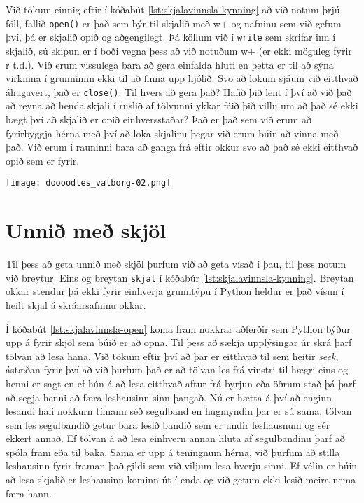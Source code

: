 Við tökum einnig eftir í kóðabút \ref{lst:skjalavinnsla-kynning} að við notum þrjú föll, fallið \texttt{open()} er það sem býr til skjalið með w+ og nafninu sem við gefum því, þá er skjalið opið og aðgengilegt.
Þá köllum við í \texttt{write} sem skrifar inn í skjalið, sú skipun er í boði vegna þess að við notuðum w+ (er ekki möguleg fyrir r t.d.).
Við erum vissulega bara að gera einfalda hluti en þetta er til að sýna virknina í grunninnn ekki til að finna upp hjólið.
Svo að lokum sjáum við eitthvað áhugavert, það er \texttt{close()}.
Til hvers að gera það?
Hafið þið lent í því að við það að reyna að henda skjali í ruslið af tölvunni ykkar fáið þið villu um að það sé ekki hægt því að skjalið er opið einhversstaðar?
Það er það sem við erum að fyrirbyggja hérna með því að loka skjalinu þegar við erum búin að vinna með það.
Við erum í rauninni bara að ganga frá eftir okkur svo að það sé ekki eitthvað opið sem er fyrir.
\phantom{easter egg}
\begin{center}
	\texttt{[image: doooodles\_valborg-02.png]}
\end{center}
\section{Unnið með skjöl}\label{uk:skjalavinnsla-kynnt}
Til þess að geta unnið með skjöl þurfum við að geta vísað í þau, til þess notum við breytur.
Eins og breytan \texttt{skjal} í kóðabúr \ref{lst:skjalavinnsla-kynning}.
Breytan okkar stendur þá ekki fyrir einhverja grunntýpu í Python heldur er það vísun í heilt skjal á skráarsafninu okkar.

Í kóðabút \ref{lst:skjalavinnsla-open} koma fram nokkrar aðferðir sem Python býður upp á fyrir skjöl sem búið er að opna.
Til þess að sækja upplýsingar úr skrá þarf tölvan að lesa hana.
Við tökum eftir því að þar er eitthvað til sem heitir \textit{seek}, ástæðan fyrir því að við þurfum það er að tölvan les frá vinstri til hægri eins og henni er sagt en ef hún á að lesa eitthvað aftur frá byrjun eða öðrum stað þá þarf að segja henni að færa leshausinn sinn þangað.
Nú er hætta á því að enginn lesandi hafi nokkurn tímann séð segulband en hugmyndin þar er sú sama, tölvan sem les segulbandið getur bara lesið bandið sem er undir leshausnum og sér ekkert annað.
Ef tölvan á að lesa einhvern annan hluta af segulbandinu þarf að spóla fram eða til baka.
Sama er upp á teningnum hérna, við þurfum að stilla leshausinn fyrir framan það gildi sem við viljum lesa hverju sinni.
Ef vélin er búin að lesa skjalið er leshausinn kominn út í enda og við getum ekki lesið meira nema færa hann.

